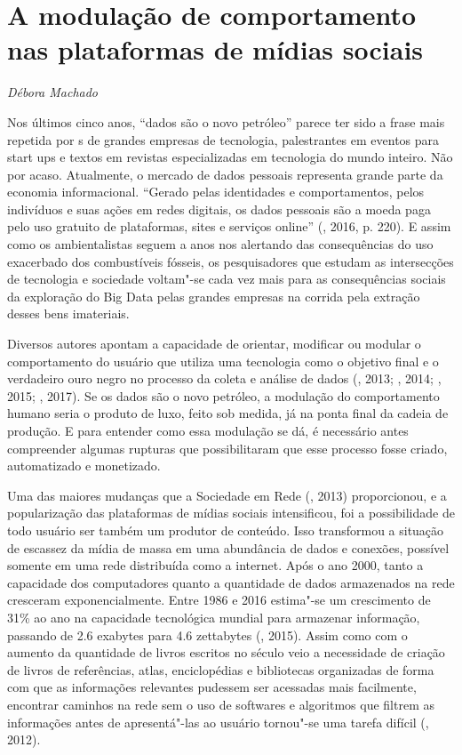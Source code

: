 \chapter{A modulação de comportamento nas plataformas de mídias sociais}

\begin{flushright}
\emph{Débora Machado}
\end{flushright}

Nos últimos cinco anos, ``dados são o novo petróleo'' parece ter sido a
frase mais repetida por s de grandes empresas de tecnologia,
palestrantes em eventos para start ups e textos em revistas
especializadas em tecnologia do mundo inteiro. Não por acaso.
Atualmente, o mercado de dados pessoais representa grande parte da
economia informacional. ``Gerado pelas identidades e comportamentos,
pelos indivíduos e suas ações em redes digitais, os dados pessoais são a
moeda paga pelo uso gratuito de plataformas, sites e serviços online''
(, 2016, p. 220). E assim como os ambientalistas
seguem a anos nos alertando das consequências do uso exacerbado dos
combustíveis fósseis, os pesquisadores que estudam as intersecções de
tecnologia e sociedade voltam"-se cada vez mais para as consequências
sociais da exploração do Big Data pelas grandes empresas na corrida pela
extração desses bens imateriais.

Diversos autores apontam a capacidade de orientar, modificar ou modular
o comportamento do usuário que utiliza uma tecnologia como o objetivo
final e o verdadeiro ouro negro no processo da coleta e análise de dados
(, 2013; , 2014; , 2015; , 2017). Se os dados são o novo petróleo, a modulação do comportamento humano seria o
produto de luxo, feito sob medida, já na ponta final da cadeia de
produção. E para entender como essa modulação se dá, é necessário antes
compreender algumas rupturas que possibilitaram que esse processo fosse
criado, automatizado e monetizado.

Uma das maiores mudanças que a Sociedade em Rede (, 2013)
proporcionou, e a popularização das plataformas de mídias sociais
intensificou, foi a possibilidade de todo usuário ser também um produtor
de conteúdo. Isso transformou a situação de escassez da mídia de massa
em uma abundância de dados e conexões, possível somente em uma rede
distribuída como a internet. Após o ano 2000, tanto a capacidade dos
computadores quanto a quantidade de dados armazenados na rede
cresceram exponencialmente. Entre 1986 e 2016 estima"-se um crescimento de
31\% ao ano na capacidade tecnológica mundial para armazenar informação,
passando de 2.6 exabytes para 4.6 zettabytes (, 2015). Assim como
com o aumento da quantidade de livros escritos no século  veio a
necessidade de criação de livros de referências, atlas, enciclopédias e
bibliotecas organizadas de forma com que as informações relevantes
pudessem ser acessadas mais facilmente, encontrar caminhos na rede sem o
uso de softwares e algoritmos que filtrem as informações antes de
apresentá"-las ao usuário tornou"-se uma tarefa difícil (, 2012).

